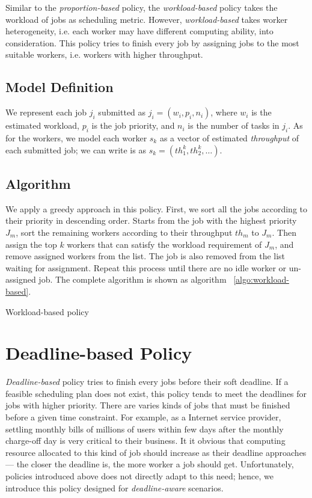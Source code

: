 
Similar to the \emph{proportion-based} policy, the \emph{workload-based}
policy takes the workload of jobs as scheduling metric.
However, \emph{workload-based} takes worker heterogeneity, i.e. each
worker may have different computing ability, into consideration.
This policy tries to finish every job by assigning jobs to the most
suitable workers, i.e. workers with higher throughput.

\subsection{Model Definition}

We represent each job $j_i$ submitted as $j_i = (w_i, p_i, n_i)$, where
$w_i$ is the estimated workload, $p_i$ is the job priority, and $n_i$
is the number of tasks in $j_i$.
As for the workers, we model each worker $s_k$ as a vector of estimated
\emph{throughput} of each submitted job; we can write is as $s_k =
(th^k_1, th^k_2, \ldots)$.

\subsection{Algorithm}

We apply a greedy approach in this policy.
First, we sort all the jobs according to their priority in descending
order.
Starts from the job with the highest priority $J_m$, sort the remaining
workers according to their throughput $th_m$ to $J_m$.
Then assign the top $k$ workers that can satisfy the workload
requirement of $J_m$, and remove assigned workers from the list.
The job is also removed from the list waiting for assignment.
Repeat this process until there are no idle worker or un-assigned job.
The complete algorithm is shown as algorithm ~\ref{algo:workload-based}.

\begin{algorithm}[htbp]

\caption{Workload-based policy}
\label{algo:workload-based}
\end{algorithm}


\section{Deadline-based Policy}	%

\emph{Deadline-based} policy tries to finish every jobs before their 
soft deadline.
If a feasible scheduling plan does not exist, this policy tends to meet
the deadlines for jobs with higher priority.
There are varies kinds of jobs that must be finished before a given 
time constraint.
For example, as a Internet service provider, settling monthly bills of
millions of users within few days after the monthly charge-off day is
very critical to their business.
It it obvious that computing resource allocated to this kind of job 
should increase as their deadline approaches --- the closer the 
deadline is, the more worker a job should get.
Unfortunately, policies introduced above does not directly adapt to 
this need; hence, we introduce this policy designed for
\emph{deadline-aware} scenarios.

